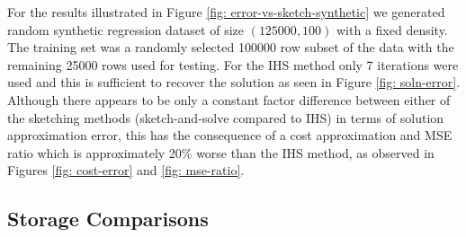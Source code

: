 \noindent For the results illustrated in Figure \ref{fig: error-vs-sketch-synthetic} we
generated random synthetic regression dataset of size
$(125000, 100)$ with a fixed density.
The training set was a randomly selected 100000 row subset of the data with the
remaining 25000 rows used for testing.
For the IHS method only 7 iterations were used and this is sufficient to recover
the solution as seen in Figure \ref{fig: soln-error}.
Although there appears to be only a constant factor difference between either of
the sketching methods (sketch-and-solve compared to IHS) in terms of solution
approximation error, this has the consequence of a cost approximation and MSE
ratio which is approximately 20\% worse than the IHS method, as observed in
Figures \ref{fig: cost-error} and \ref{fig: mse-ratio}.





\subsection{Storage Comparisons}
